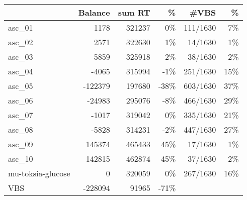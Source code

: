 \begin{tabular}{lrrrrr}
\toprule
 & Balance & sum RT &  \% & #VBS & \% \\
\midrule
asc_01 & 1178 & 321237 & 0\% & 111/1630 & 7\% \\
asc_02 & 2571 & 322630 & 1\% & 14/1630 & 1\% \\
asc_03 & 5859 & 325918 & 2\% & 38/1630 & 2\% \\
asc_04 & -4065 & 315994 & -1\% & 251/1630 & 15\% \\
asc_05 & -122379 & 197680 & -38\% & 603/1630 & 37\% \\
asc_06 & -24983 & 295076 & -8\% & 466/1630 & 29\% \\
asc_07 & -1017 & 319042 & 0\% & 335/1630 & 21\% \\
asc_08 & -5828 & 314231 & -2\% & 447/1630 & 27\% \\
asc_09 & 145374 & 465433 & 45\% & 17/1630 & 1\% \\
asc_10 & 142815 & 462874 & 45\% & 37/1630 & 2\% \\
mu-toksia-glucose & 0 & 320059 & 0\% & 267/1630 & 16\% \\
\midrule
VBS & -228094 & 91965 & -71\% &  &  \\
\bottomrule
\end{tabular}
